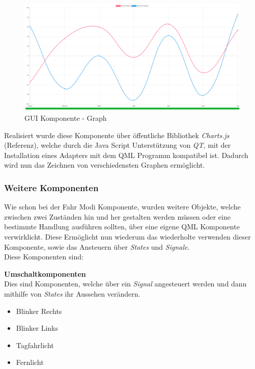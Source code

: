 \begin{figure}[H]
	\begin{center}
		\includegraphics[scale=0.3]{figures/hcis/component_graph.png}
		\caption{GUI Komponente - Graph}
				\label{fig:kompGraph}
	\end{center}
\end{figure}

Realisiert wurde diese Komponente über öffentliche Bibliothek \textit{Charts.js} (Referenz), welche durch die Java Script Unterstützung von \textit{QT}, mit der Installation eines Adapters mit dem QML Programm kompatibel ist. Dadurch wird nun das Zeichnen von verschiedensten Graphen ermöglicht.

\subsubsection{Weitere Komponenten}

Wie schon bei der Fahr Modi Komponente, wurden weitere Objekte, welche zwischen zwei Zuständen hin und her gestalten werden müssen oder eine bestimmte Handlung ausführen sollten, über eine eigene QML Komponente verwirklicht. Diese Ermöglicht nun wiederum das wiederholte verwenden dieser Komponente, sowie das Ansteuern über \textit{States} und \textit{Signale}.\\
Diese Komponenten sind:

\textbf{Umschaltkomponenten}\\
Dies sind Komponenten, welche über ein \textit{Signal} angesteuert werden und dann mithilfe von \textit{States} ihr Aussehen verändern.

\begin{itemize}
	
	\item Blinker Rechts
	\item Blinker Links
	\item Tagfahrlicht
	\item Fernlicht
	
\end{itemize}

